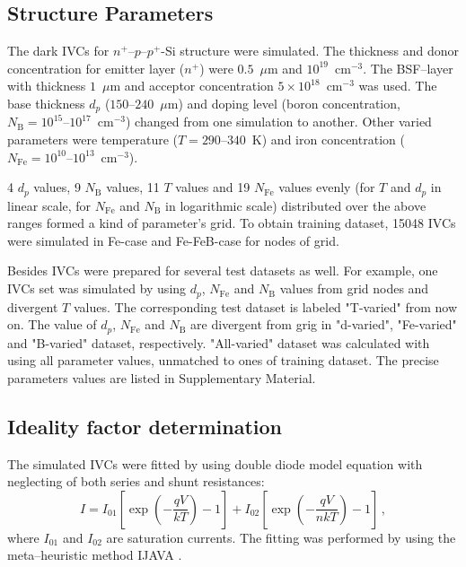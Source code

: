 \documentclass[journal]{IEEEtran}
\begin{document}
\subsection{Structure Parameters}

The dark IVCs for $n^+$--$p$--$p^+$-Si structure were simulated.
The thickness and donor concentration for emitter layer ($n^+$) were $0.5$~$\mu$m and $10^{19}$~cm$^{-3}$.
The BSF--layer with thickness  $1$~$\mu$m and acceptor concentration $5\times10^{18}$~cm$^{-3}$ was used.
The base thickness $d_p$ ($150$--$240$~$\mu$m) and doping level (boron concentration, $N_\mathrm{B}=10^{15}$--$10^{17}$~cm$^{-3}$) changed from one simulation to another.
Other varied parameters were temperature ($T=290$--$340$~K) and iron concentration ($N_{\mathrm{Fe}}=10^{10}$--$10^{13}$~cm$^{-3}$).


4 $d_p$ values, 9 $N_\mathrm{B}$ values, 11 $T$ values and 19 $N_{\mathrm{Fe}}$ values 
evenly 
(for $T$ and $d_p$ in linear scale, for $N_{\mathrm{Fe}}$ and $N_\mathrm{B}$ in logarithmic scale)
distributed over the above ranges formed a kind of parameter's grid.
To obtain training dataset, 15048 IVCs were simulated in Fe-case and Fe-FeB-case for nodes of grid.

Besides IVCs were prepared for several test datasets as well.
For example, one IVCs set was simulated by using $d_p$, $N_{\mathrm{Fe}}$ and $N_\mathrm{B}$ values
from grid nodes and divergent $T$ values.
The corresponding test dataset is labeled "T-varied" from now on.
The value of $d_p$, $N_{\mathrm{Fe}}$ and $N_\mathrm{B}$ are divergent from  grig in "d-varied",
"Fe-varied" and "B-varied" dataset, respectively.
"All-varied" dataset was calculated with using all parameter values, unmatched to ones of training dataset.
The precise parameters values are listed in  Supplementary Material.

\subsection{Ideality factor determination}

The simulated IVCs were fitted by using double diode model \cite{Breitenstein2013} equation 
with neglecting of both series and shunt resistances:
\begin{equation}
\label{eqIV}
    I=I_{01}\left[\exp\left(-\frac{qV}{kT}\right)-1\right]+ I_{02}\left[\exp\left(-\frac{qV}{nkT}\right)-1\right]\,,
\end{equation}
where
$I_{01}$ and $I_{02}$ are saturation currents.
The fitting was performed by using the meta--heuristic method IJAVA \cite{IJAVA}.
\end{document}
